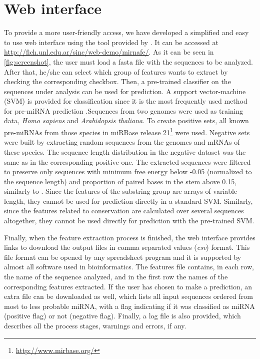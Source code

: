 \documentclass{article}
\begin{document}
\section{Web interface}
To provide a more user-friendly access, we have developed a simplified and easy to use web interface using the tool provided by \cite{Stegmayer15}. It can be 
accessed at \url{http://fich.unl.edu.ar/sinc/web-demo/mirnafe/}. As it can be seen in \autoref{fig:screenshot}, the user must load a fasta file with the 
sequences to be analyzed. After that, he/she can select which group of features wants to extract by checking the corresponding checkbox. Then, a pre-trained 
classifier on the sequences under analysis can be used for prediction. A support vector-machine (SVM) is provided for classification since it is the most 
frequently used method for pre-miRNA prediction \citep{Kleftogiannis13}.Sequences from two genomes were used as training data, \textit{Homo sapiens} and 
\textit{Arabidopsis thaliana}. To create positive sets, all known pre-miRNAs from those species in miRBase release 21\footnote{\url{http://www.mirbase.org/}} 
\citep{Kozomara14} were used. Negative sets were built by extracting random sequences from the genomes and mRNAs of these species. The sequence length 
distribution in the negative dataset was the same as in the corresponding positive one. The extracted sequences were filtered to preserve only sequences with 
minimum free energy below -0.05 (normalized to the sequence length) and proportion of paired bases in the stem above 0.15, similarly to \cite{Gudys13}. Since 
the features of the substring group are arrays of variable length, they cannot be used for prediction directly in a standard SVM. Similarly, since the features 
related to conservation are calculated over several sequences altogether, they cannot be used directly for prediction with the pre-trained SVM.

Finally, when the feature extraction process is finished, the web interface provides links to download the output files in comma separated values 
(\textit{csv}) format. This file format can be opened by any spreadsheet program and it is supported by almost all software used in bioinformatics. The 
features file contains, in each row, the name of the sequence analyzed, and in the first row the names of the corresponding features extracted. If the user has 
chosen to make a prediction, an extra file can be downloaded as well, which lists all input sequences ordered from most to less probable miRNA, with a flag 
indicating if it was classified as miRNA (positive flag) or not (negative flag). Finally, a log file is also provided, which describes all the process stages, 
warnings and errors, if any.
\end{document}
